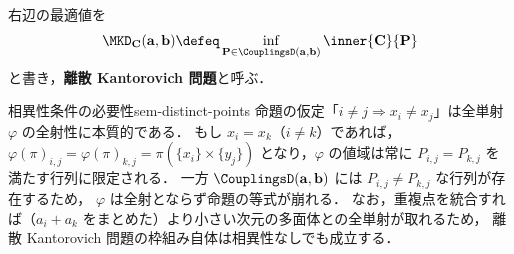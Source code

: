 右辺の最適値を
\[
  \MKD_{\mathbf{C}}(\mathbf{a}, \mathbf{b})
  \defeq \inf_{\mathbf{P} \in \CouplingsD(\mathbf{a}, \mathbf{b})} \inner{\mathbf{C}}{\mathbf{P}}
\]
と書き，\textbf{離散 Kantorovich 問題}と呼ぶ．

\begin{remark}{相異性条件の必要性}{sem-distinct-points}
  命題の仮定「$i \neq j \Rightarrow x_i \neq x_j$」は全単射 $\varphi$ の全射性に本質的である．
  もし $x_i = x_k$（$i \neq k$）であれば，$\varphi(\pi)_{i,j} = \varphi(\pi)_{k,j} = \pi(\{x_i\} \times \{y_j\})$
  となり，$\varphi$ の値域は常に $P_{i,j} = P_{k,j}$ を満たす行列に限定される．
  一方 $\CouplingsD(\mathbf{a}, \mathbf{b})$ には $P_{i,j} \neq P_{k,j}$ な行列が存在するため，
  $\varphi$ は全射とならず命題の等式が崩れる．
  なお，重複点を統合すれば（$a_i + a_k$ をまとめた）より小さい次元の多面体との全単射が取れるため，
  離散 Kantorovich 問題の枠組み自体は相異性なしでも成立する．
\end{remark}

